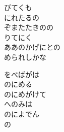 \documentclass[10pt,b5j]{tarticle} %
\begin{document}
\begin{enumerate}
\begin{minipage}[c]{\blocksize}
        \vspace{\linespace}
        \item
        びてくも\\
        にれたるの\\
        ぞまたたきのの\\
        りてにく\\
        ああのかげにとの\\
        められしかな
        
        \vspace{\linespace}
        \item
        をべばがは\\
        のにめる\\
        のにめがけて\\
        へのみは\\
        のによでん\\
        の
    
    \end{minipage}
\end{enumerate} %
\end{document}
